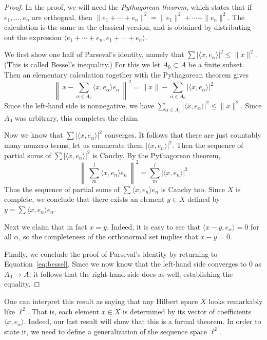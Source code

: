 \documentclass[11pt,oneside]{amsbook}
\theoremstyle{definition}
\theoremstyle{plain}
\theoremstyle{definition}
\theoremstyle{remark}
\numberwithin{equation}{section}
\numberwithin{figure}{section}
\begin{document}
\begin{proof}
  In the proof, we will need the \emph{Pythagorean theorem}, which states that if $e_1,\ldots,e_n$ are orthognal, then $\|e_1+\cdots+e_n\|^2=\|e_1\|^2+\cdots+\|e_n\|^2$. The calculation is the same as the classical version, and is obtained by distributing out the expression $\langle e_1+\cdots+e_n,e_1+\cdots+e_n\rangle$.

  We first show one half of Parseval's identity, namely that $\sum|\langle x,e_\alpha\rangle|^2\leq\|x\|^2$. (This is called Bessel's inequality.) For this we let $A_0\subset A$ be a finite subset. Then an elementary calculation together with the Pythagorean theorem gives
  \begin{equation}
    \label{eq:bessel}
    \left\|\,x-\sum_{\alpha\in A_0}\langle x,e_\alpha\rangle e_\alpha\,\right\|^2
    =\|x\|-\sum_{\alpha\in A_0}|\langle x,e_\alpha\rangle|^2
  \end{equation}
  Since the left-hand side is nonnegative, we have $\sum_{\alpha\in A_0}|\langle x,e_\alpha\rangle|^2\leq\|x\|^2$. Since $A_0$ was arbitrary, this completes the claim.

  Now we know that $\sum|\langle x,e_\alpha\rangle|^2$ converges. It follows that there are just countably many nonzero terms, let us enumerate them $|\langle x,e_n\rangle|^2$. Then the sequence of partial sums of $\sum|\langle x,e_n\rangle|^2$ is Cauchy. By the Pythagorean theorem,
  \[\left\|\,\sum_m^l\langle x,e_n\rangle e_n\,\right\|^2
    =\sum_m^l|\langle x,e_n\rangle|^2
  \]
  Thus the sequence of partial sums of $\sum\langle x,e_n\rangle e_n$ is Cauchy too. Since $X$ is complete, we conclude that there exists an element $y\in X$ defined by $y=\sum\langle x,e_\alpha\rangle e_\alpha$.

  Next we claim that in fact $x=y$. Indeed, it is easy to see that $\langle x-y,e_\alpha\rangle=0$ for all $\alpha$, so the completeness of the orthonormal set implies that $x-y=0$.

  Finally, we conclude the proof of Parseval's identity by returning to Equation~\eqref{eq:bessel}. Since we now know that the left-hand side converges to $0$ as $A_0\to A$, it follows that the right-hand side does as well, establishing the equality.
\end{proof}

One can interpret this result as saying that any Hilbert space $X$ looks remarkably like $\ell^2$. That is, each element $x\in X$ is determined by its vector of coefficients $\langle x,e_\alpha\rangle$. Indeed, our last result will show that this is a formal theorem. In order to state it, we need to define a generalization of the sequence space $\ell^2$.
\end{document}
